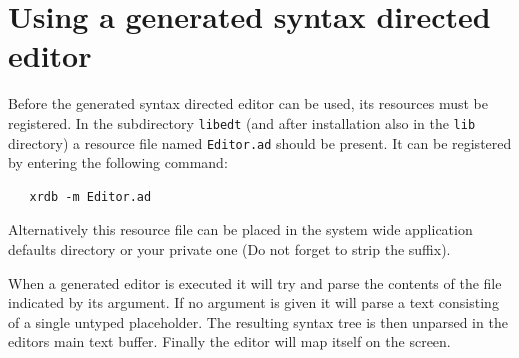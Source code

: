 \section {Using a generated syntax directed editor}
Before the generated syntax directed editor can be used, its
resources must be registered. In the subdirectory {\tt libedt}
(and after installation also in the {\tt lib} directory) a
resource file named {\tt Editor.ad} should be present. It can
be registered by entering the following command:
\begin{verbatim}
   xrdb -m Editor.ad
\end{verbatim}
Alternatively this resource file can be placed in the system wide
application defaults directory or your private one (Do not forget
to strip the suffix).

When a generated editor is executed it will try and parse
the contents of the file indicated by its argument. If no argument
is given it will parse a text consisting of a single untyped
placeholder. The resulting syntax tree is then unparsed in the
editors main text buffer. Finally the editor will map itself
on the screen.

